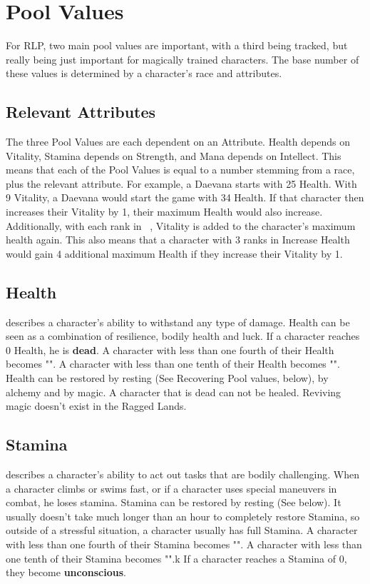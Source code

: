 \section{Pool Values}\label{sec:pools}
For RLP, two main pool values are important, with a third being tracked, but really being just important for magically trained characters.
The base number of these values is determined by a character's race and attributes.\\

\subsection{Relevant Attributes}\label{subsec:relevantAttributesPools}
The three Pool Values are each dependent on an Attribute.
Health depends on Vitality, Stamina depends on Strength, and Mana depends on Intellect.
This means that each of the Pool Values is equal to a number stemming from a race, plus the relevant attribute.
For example, a Daevana starts with 25 Health.
With 9 Vitality, a Daevana would start the game with 34 Health.
If that character then increases their Vitality by 1, their maximum Health would also increase.
Additionally, with each rank in ~, Vitality is added to the character's maximum health again.
This also means that a character with 3 ranks in Increase Health would gain 4 additional maximum Health if they increase their Vitality by 1.

\subsection{Health}\label{pool:health} describes a character's ability to withstand any type of damage.
Health can be seen as a combination of resilience, bodily health and luck.
If a character reaches 0 Health, he is \textbf{dead}.
A character with less than one fourth of their Health becomes "".
A character with less than one tenth of their Health becomes "".
Health can be restored by resting (See Recovering Pool values, below), by alchemy and by magic.
A character that is dead can not be healed.
Reviving magic doesn't exist in the Ragged Lands.\\

\subsection{Stamina}\label{pool:stamina} describes a character's ability to act out tasks that are bodily challenging.
When a character climbs or swims fast, or if a character uses special maneuvers in combat, he loses stamina.
Stamina can be restored by resting (See below).
It usually doesn't take much longer than an hour to completely restore Stamina, so outside of a stressful situation, a character usually has full Stamina.
A character with less than one fourth of their Stamina becomes "".
A character with less than one tenth of their Stamina becomes "".k
If a character reaches a Stamina of 0, they become \textbf{unconscious}.\\

